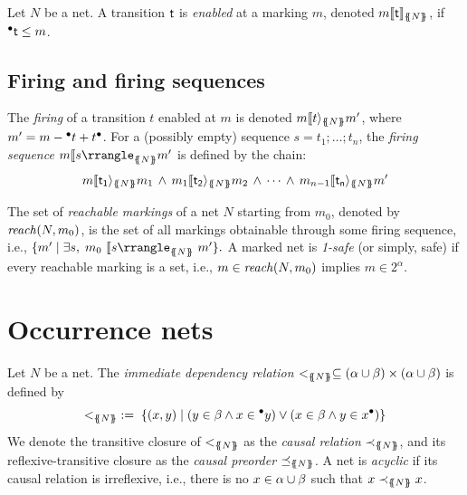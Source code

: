 \begin{definition}
  \label{def:enabled}
  Let $N$ be a net. A transition ${\sf t}$ is \emph{enabled} at a marking $m$,
  denoted $m\llbracket {\sf t}\rrbracket_{\{\!\!\{ N \}\!\!\}}$, if ${}^\bullet{{\sf t}}\le m$.
\end{definition}

\section{Firing and firing sequences}

\begin{definition}
  \label{def:firing}\label{def:fs, float=!t}
 The \emph{firing} of a transition $t$ enabled at $m$ is denoted $m \llbracket t \rangle_{\{\!\!\{ N \}\!\!\}} m'$, where $m' = m - {}^\bullet{t} + t^\bullet$. For a (possibly empty) sequence $s = t_1; \dots; t_n$, the \emph{firing sequence} $m \fs{s}_{\llBra N \rrBra} m'$ is defined by the chain:
 \[    m \fir{\tr{t_1}}_{\llBra N \rrBra} m_1 \,\wedge\, m_1 \fir{\tr{t_2}}_{\llBra N \rrBra} m_2  \,\wedge\, \cdots  \,\wedge\, m_{n-1} \fir{\tr{t_n}}_{\llBra N \rrBra} m'
 \]
\end{definition}


\begin{definition}
The set of \emph{reachable markings} of a net $N$ starting from $m_0$, denoted by ${\it reach}(N,m_0)$, is the set of all markings obtainable through some firing sequence, i.e.,
$ \{m' \mid \exists s, \; m_0 \ \fs{s}_{\llBra N\rrBra} \ m' \}.$
A marked net is \emph{1-safe} (or simply, safe) if every reachable marking is a set, i.e., $m \in {\it reach}(N, m_0)$ implies $m \in 2^{\alpha}$.
\end{definition}

\chapter{Occurrence nets}

\begin{definition}
  \label{def:immediate_dependency}
Let $N$ be a net. The \emph{immediate dependency relation}
$<_{\{\!\!\{ N \}\!\!\}}\subseteq{(\alpha\cup\beta)\times(\alpha\cup\beta)}$
is  defined by
  \begin{equation}\label{eq:immediate_dependency}
  <_{\{\!\!\{ N \}\!\!\}} \; := \; \{ (x,y) \mid
  (y\in \beta \wedge x\in{}^\bullet{y}) \vee
  (x\in \beta \wedge y \in x^\bullet)\}
\end{equation}
We denote the transitive closure of  $<_{\{\!\!\{ N \}\!\!\}}$ as the \emph{causal relation} $\prec_{\{\!\!\{ N \}\!\!\}}$, and its reflexive-transitive closure as the \emph{causal preorder} $\preceq_{\{\!\!\{ N \}\!\!\}}$. A net is \emph{acyclic} if its causal relation is irreflexive, i.e., there is no $x \in \alpha \cup \beta$ such that $x \prec_{\{\!\!\{ N \}\!\!\}} x$.
\end{definition}

